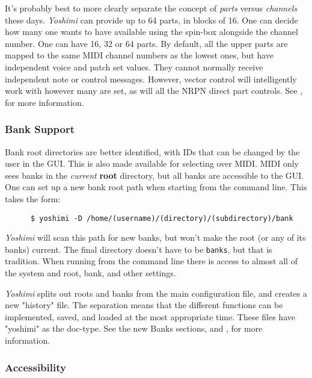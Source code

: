 \documentclass[
 11pt,
 twoside,
 a4paper,
 final                                 %
]{article}
\begin{document}
   It's probably best to more clearly separate the concept of
   \textsl{parts} versus \textsl{channels} these days.
   \textsl{Yoshimi} can provide up to 64 parts, in blocks of 16. One can
   decide how many one wants to have available using the spin-box alongside
   the channel number.  One can have 16, 32 or 64 parts.  By default, all the
   upper parts are mapped to the same MIDI channel numbers as the lowest ones,
   but have independent voice and patch set values. They cannot normally
   receive independent note or control messages. However, vector control will
   intelligently work with however many are set, as will all the NRPN direct
   part controls.
   See , for more information.

\subsubsection{Bank Support}
\label{subsubsec:new_features_bank_support}

   Bank root directories are better identified, with IDs that can be changed by
   the user in the GUI. This is also made available for selecting over MIDI.
   MIDI only sees banks in the \textsl{current}
   \textbf{root} directory, but all banks are accessible to the GUI.
   One can set up a new bank root path when starting from the
   command line. This takes the form:

   \begin{verbatim}
      $ yoshimi -D /home/(username)/(directory)/(subdirectory)/bank
   \end{verbatim}

   \textsl{Yoshimi} will scan this path for new banks, but
   won't make the root (or any of its banks) current. The final directory
   doesn't have to be \texttt{banks}, but that is tradition.
   When running from the command line there is access to almost all of the
   system and root, bank, and other settings.

   \textsl{Yoshimi} splits out roots and banks from the main configuration
   file, and creates a new "history" file. The separation means that the
   different functions can be implemented, saved, and loaded at the most
   appropriate time. These files have "yoshimi" as the doc-type.
   See the new Banks sections,
   and
   ,
   for more information.

\subsubsection{Accessibility}
\label{subsubsec:new_features_accessibility}
\end{document}
